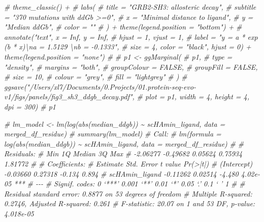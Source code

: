 \documentclass[
]{article}
\newenvironment{Shaded}{\begin{snugshade}}{\end{snugshade}}
\newcommand{\CommentTok}[1]{\textcolor[rgb]{0.56,0.35,0.01}{\textit{#1}}}
\begin{document}
\begin{Shaded}
\begin{Highlighting}[]
\CommentTok{\#   theme\_classic() +}
\CommentTok{\#   labs(}
\CommentTok{\#     title = "GRB2{-}SH3: allosteric decay",}
\CommentTok{\#     subtitle = "370 mutations with ddGb \textgreater{}=0",}
\CommentTok{\#     x = "Minimal distance to ligand",}
\CommentTok{\#     y = "Median ddGb",}
\CommentTok{\#     color = ""}
\CommentTok{\#   )  + theme(legend.position = "bottom") +}
\CommentTok{\#     annotate("text",  x = Inf, y = Inf,}
\CommentTok{\#              hjust = 1, vjust = 1,}
\CommentTok{\#            label = "y = a * exp (b * x)\textbackslash{}na = 1.5129  \textbackslash{}nb = {-}0.1333",}
\CommentTok{\#            size = 4, color = "black", hjust = 0) + theme(legend.position = "none")}
\CommentTok{\# }
\CommentTok{\# p1 \textless{}{-} ggMarginal(}
\CommentTok{\#   p1,}
\CommentTok{\#   type = "density",}
\CommentTok{\#   margins = "both",}
\CommentTok{\#   groupColour = FALSE,}
\CommentTok{\#   groupFill = FALSE,}
\CommentTok{\#   size = 10,}
\CommentTok{\#   colour = "grey",}
\CommentTok{\#   fill = "lightgrey"}
\CommentTok{\# )}
\CommentTok{\# ggsave("/Users/xl7/Documents/0.Projects/01.protein{-}seq{-}evo{-}v1/figs/panels/fig3\_sh3\_ddgb\_decay.pdf", }
\CommentTok{\#        plot = p1, width = 4, height = 4, dpi = 300)}
\CommentTok{\# p1}
\end{Highlighting}
\end{Shaded}

\begin{Shaded}
\begin{Highlighting}[]
\CommentTok{\# lm\_model \textless{}{-} lm(log(abs(median\_ddgb)) \textasciitilde{} scHAmin\_ligand, data = merged\_df\_residue)}
\CommentTok{\# summary(lm\_model)}
\CommentTok{\# Call:}
\CommentTok{\# lm(formula = log(abs(median\_ddgb)) \textasciitilde{} scHAmin\_ligand, data = merged\_df\_residue)}
\CommentTok{\# }
\CommentTok{\# Residuals:}
\CommentTok{\#      Min       1Q   Median       3Q      Max }
\CommentTok{\# {-}2.06277 {-}0.49682  0.05624  0.75934  1.81772 }
\CommentTok{\# }
\CommentTok{\# Coefficients:}
\CommentTok{\#                Estimate Std. Error t value Pr(\textgreater{}|t|)    }
\CommentTok{\# (Intercept)    {-}0.03660    0.27318  {-}0.134    0.894    }
\CommentTok{\# scHAmin\_ligand {-}0.11262    0.02514  {-}4.480 4.02e{-}05 ***}
\CommentTok{\# {-}{-}{-}}
\CommentTok{\# Signif. codes:  0 ‘***’ 0.001 ‘**’ 0.01 ‘*’ 0.05 ‘.’ 0.1 ‘ ’ 1}
\CommentTok{\# }
\CommentTok{\# Residual standard error: 0.8877 on 53 degrees of freedom}
\CommentTok{\# Multiple R{-}squared:  0.2746,  Adjusted R{-}squared:  0.261 }
\CommentTok{\# F{-}statistic: 20.07 on 1 and 53 DF,  p{-}value: 4.018e{-}05}
\end{Highlighting}
\end{Shaded}
\end{document}
